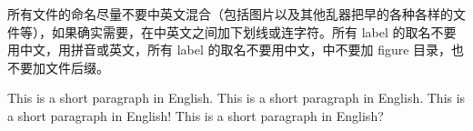 \documentclass[Manu]{subfiles}
\begin{document}

所有文件的命名尽量不要中英文混合（包括图片以及其他乱器把早的各种各样的文件等），如果确实需要，在中英文之间加下划线或连字符。所有 label 的取名不要用中文，用拼音或英文，所有 label 的取名不要用中文，中不要加 figure 目录，也不要加文件后缀。


This is a short paragraph in English. This is a short paragraph in English.
This is a short paragraph in English!   This is a short paragraph in English?

\end{document}

